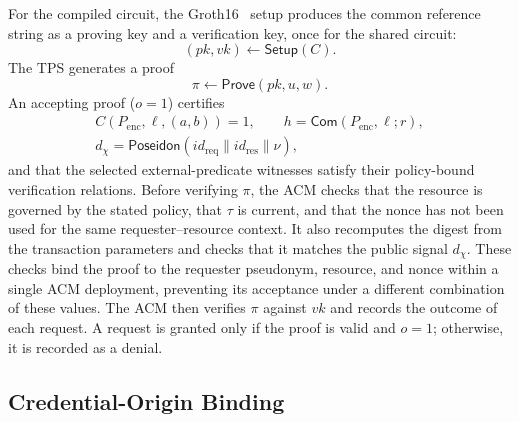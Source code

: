 For the compiled circuit, the Groth16~\cite{groth2016size} setup produces the common reference string as a proving key and a verification key, once for the shared circuit:
\begin{equation}
	(\mathit{pk}, \mathit{vk}) \leftarrow \mathsf{Setup}(C).
\end{equation}
The TPS generates a proof
\begin{equation}
	\pi \leftarrow \mathsf{Prove}(\mathit{pk}, u, w).
\end{equation}
An accepting proof ($o=1$) certifies
\begin{equation}
	\begin{gathered}
		C(P_{\mathrm{enc}},\ell,(a,b))=1, \qquad h=\mathsf{Com}(P_{\mathrm{enc}},\ell;r), \\
		d_{\chi}=\mathsf{Poseidon}(\mathit{id}_{\mathrm{req}}\parallel\mathit{id}_{\mathrm{res}}\parallel\nu),
	\end{gathered}
\end{equation}
and that the selected external-predicate witnesses satisfy their policy-bound verification relations.
Before verifying $\pi$, the ACM checks that the resource is governed by the stated policy, that $\tau$ is current, and that the nonce has not been used for the same requester--resource context.
It also recomputes the digest from the transaction parameters and checks that it matches the public signal $d_{\chi}$.
These checks bind the proof to the requester pseudonym, resource, and nonce within a single ACM deployment, preventing its acceptance under a different combination of these values.
The ACM then verifies $\pi$ against $\mathit{vk}$ and records the outcome of each request.
A request is granted only if the proof is valid and $o=1$; otherwise, it is recorded as a denial.

\subsection{Credential-Origin Binding}
\label{subsec:credential}

